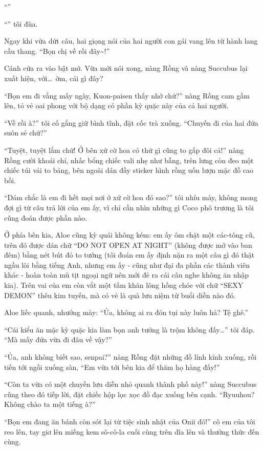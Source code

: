 \documentclass[../main.tex]{subfiles}
\begin{document}
``''

``'' tôi đùa.

Ngay khi vừa dứt câu, hai giọng nói của hai người con gái vang lên từ hành lang cầu thang. ``Bọn chị về rồi đây\~{}!''

Cánh cửa ra vào bật mở. Vừa mới nói xong, nàng Rồng và nàng Succubus lại xuất hiện, với\dots\ ờm, cái gì đây?

``Bọn em đi vắng mấy ngày, Kuon-paisen thấy nhớ chứ?'' nàng Rồng cam gầm lên, tỏ vẻ oai phong với bộ dạng có phần kỳ quặc này của cả hai người.

``Về rồi à?'' tôi cố gắng giữ bình tĩnh, đặt cốc trà xuống. ``Chuyến đi của hai đứa suôn sẻ chứ?''

``Tuyệt, tuyệt lắm chứ! Ở bên xứ cờ hoa có thứ gì cũng to gấp đôi cả!'' nàng Rồng cười khoái chí, nhấc bổng chiếc vali nhẹ như bẫng, trên lưng còn đeo một chiếc túi vải to bảng, bên ngoài dán đầy sticker hình rồng uốn lượn mặc đồ cao bồi.

``Dám chắc là em đi hết mọi nơi ở xứ cờ hoa đó sao?'' tôi nhíu mày, không mong đợi gì từ câu trả lời của em ấy, vì chỉ cần nhìn những gì Coco phô trương là tôi cũng đoán được phần nào.

Ở phía bên kia, Aloe cũng kỳ quái không kém: em ấy ôm chặt một các-tông cũ, trên đó được dán chữ ``DO NOT OPEN AT NIGHT'' (không được mở vào ban đêm) bằng nét bút đỏ to tướng (tôi đoán em ấy định nặn ra một câu gì đó thật ngầu lòi bằng tiếng Anh, nhưng em ấy - cũng như đại đa phần các thành viên khác - hoàn toàn mù tịt ngoại ngữ nên mới đẻ ra cái câu nghe không ăn nhập kia). Trên vai của em còn vắt một tấm khăn lông hồng chóe với chữ ``SEXY DEMON'' thêu kim tuyến, mà có vẻ là quà lưu niệm từ buổi diễn nào đó.

Aloe liếc quanh, nhướng mày: ``Ủa, không ai ra đón tụi này luôn hả? Tệ ghê.''

``Cái kiểu ăn mặc kỳ quặc kia làm bọn anh tưởng là trộm không đấy\dots'' tôi đáp. ``Mà mấy đứa vừa đi đâu về vậy?''

``Ủa, anh không biết sao, senpai?'' nàng Rồng đặt những đồ lỉnh kỉnh xuống, rồi tiến tới ngồi xuống sàn, ``Em vừa tới bên kia để thăm họ hàng đấy!''

``Còn ta vừa có một chuyến lưu diễn nhỏ quanh thành phố này!'' nàng Succubus cũng theo đó tiếp lời, đặt chiếc hộp lọc xọc đồ đạc xuống bên cạnh. ``Ryuuhou? Không chào ta một tiếng à?''

``Bọn em đang ăn bánh còn sót lại từ tiệc sinh nhật của Onii đó!'' cô em của tôi reo lên, tay giơ lên miếng kem sô-cô-la cuối cùng trên dĩa lên và thưởng thức đến cùng.
\end{document}

